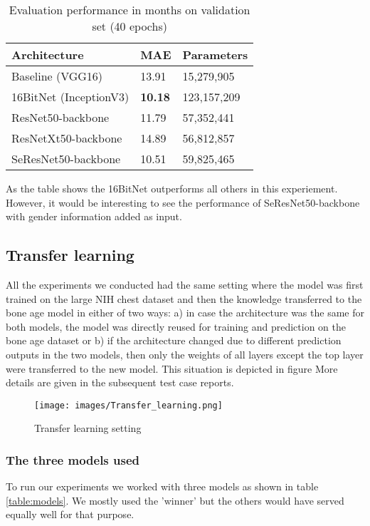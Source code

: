 \documentclass[10pt,twocolumn,letterpaper]{article}
\begin{document}
\begin{table}[h]
\begin{center}
\begin{tabular}{|l|l|l|}
\hline
Architecture & MAE & Parameters \\
\hline\hline
Baseline (VGG16) & 13.91 & 15,279,905 \\
16BitNet (InceptionV3) & \textbf{10.18} & 123,157,209 \\
ResNet50-backbone & 11.79 & 57,352,441 \\
ResNetXt50-backbone & 14.89 & 56,812,857 \\
SeResNet50-backbone & 10.51 & 59,825,465 \\
\hline
\end{tabular}
\end{center}
\caption{Evaluation performance in months on validation set (40 epochs)}
\label{table:archcomp}
\end{table}

As the table shows the 16BitNet outperforms all others in this experiement. However, it would be interesting to see the performance of SeResNet50-backbone with gender information added as input.


\subsection{Transfer learning}
All the experiments we conducted had the same setting where the model was first trained on the large NIH chest dataset and then the knowledge transferred to the bone age model in either of two ways: a) in case the architecture was the same for both models, the model was directly reused for training and prediction on the bone age dataset or b) if the architecture changed due to different prediction outputs in the two models, then only the weights of all layers except the top layer were transferred to the new model. This situation is depicted in figure More details are given in the subsequent test case reports.

\begin{figure}[h]
\texttt{[image: images/Transfer\_learning.png]}
\centering
\caption{Transfer learning setting}
\label{fig:transferls}
\end{figure}

\subsubsection{The three models used}
To run our experiments we worked with three models as shown in table \ref{table:models}. We mostly used the 'winner' but the others would have served equally well for that purpose.
\end{document}
